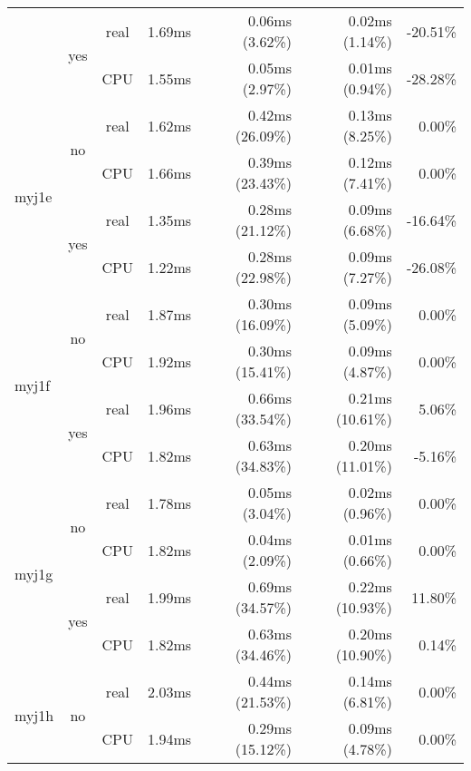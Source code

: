 \documentclass[en]{pracamgr}
\begin{document}
\begin{appendices}
\begin{small}
\begin{longtable}{|l|c|c|r|r|r|r|}
                          \cline{2-7}
                          & \multirow{2}{*}{yes} & real & 1.69ms & 0.06ms (3.62\%) & 0.02ms (1.14\%) & -20.51\% \\*
                          &                      & CPU  & 1.55ms & 0.05ms (2.97\%) & 0.01ms (0.94\%) & -28.28\% \\
\hline
\multirow{4}{*}{myj1e}    & \multirow{2}{*}{no}  & real & 1.62ms & 0.42ms (26.09\%) & 0.13ms (8.25\%) & 0.00\% \\*
                          &                      & CPU  & 1.66ms & 0.39ms (23.43\%) & 0.12ms (7.41\%) & 0.00\% \\*
                          \cline{2-7}
                          & \multirow{2}{*}{yes} & real & 1.35ms & 0.28ms (21.12\%) & 0.09ms (6.68\%) & -16.64\% \\*
                          &                      & CPU  & 1.22ms & 0.28ms (22.98\%) & 0.09ms (7.27\%) & -26.08\% \\
\hline
\multirow{4}{*}{myj1f}    & \multirow{2}{*}{no}  & real & 1.87ms & 0.30ms (16.09\%) & 0.09ms (5.09\%) & 0.00\% \\*
                          &                      & CPU  & 1.92ms & 0.30ms (15.41\%) & 0.09ms (4.87\%) & 0.00\% \\*
                          \cline{2-7}
                          & \multirow{2}{*}{yes} & real & 1.96ms & 0.66ms (33.54\%) & 0.21ms (10.61\%) & 5.06\% \\*
                          &                      & CPU  & 1.82ms & 0.63ms (34.83\%) & 0.20ms (11.01\%) & -5.16\% \\
\hline
\multirow{4}{*}{myj1g}    & \multirow{2}{*}{no}  & real & 1.78ms & 0.05ms (3.04\%) & 0.02ms (0.96\%) & 0.00\% \\*
                          &                      & CPU  & 1.82ms & 0.04ms (2.09\%) & 0.01ms (0.66\%) & 0.00\% \\*
                          \cline{2-7}
                          & \multirow{2}{*}{yes} & real & 1.99ms & 0.69ms (34.57\%) & 0.22ms (10.93\%) & 11.80\% \\*
                          &                      & CPU  & 1.82ms & 0.63ms (34.46\%) & 0.20ms (10.90\%) & 0.14\% \\
\hline
\multirow{4}{*}{myj1h}    & \multirow{2}{*}{no}  & real & 2.03ms & 0.44ms (21.53\%) & 0.14ms (6.81\%) & 0.00\% \\*
                          &                      & CPU  & 1.94ms & 0.29ms (15.12\%) & 0.09ms (4.78\%) & 0.00\% \\*

\end{longtable}
\end{small}
\end{appendices}
\end{document}
